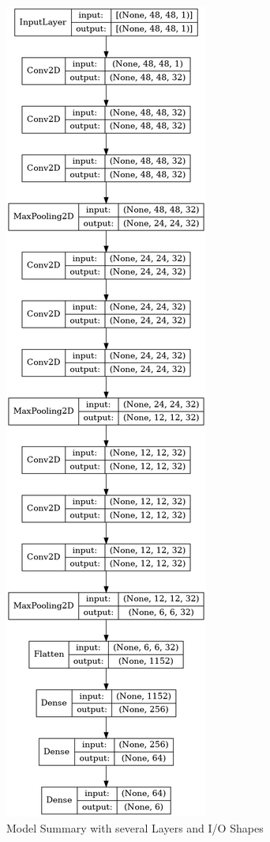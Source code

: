 \documentclass[12pt, a4paper]{scrbook}
\begin{document}
\begin{figure}[h]
\includegraphics[viewport=0 0 455 510]{Bilder/ModelSummary.png}
\caption{ Model Summary with several Layers and I/O Shapes }
\label{fig:Model Summary}
\end{figure}
\end{document}

